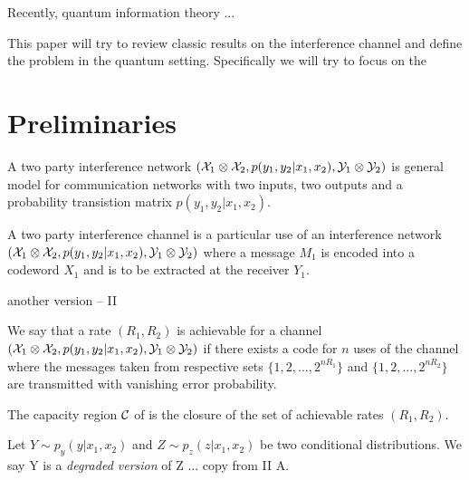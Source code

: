 \documentclass[aps,11pt,twoside,letterpaper]{article}
\begin{document}
    Recently, quantum information theory ...
    
    This paper will try to review classic results on the interference channel and
    define the problem in the quantum setting.
    Specifically we will try to focus on the 
    
    
    
    
 \section{Preliminaries}

        \begin{definition}
            A two party interference network $({\cal X}_1 \otimes {\cal X}_2, p(y_1,y_2|x_1,x_2), {\cal Y}_1 \otimes {\cal Y}_2)$ 
            is general model for communication networks with two inputs, two outputs and a probability transistion
            matrix $p(y_1,y_2|x_1,x_2)$.
        \end{definition}
        
        

        \begin{definition}
            A two party interference channel is a particular use of an interference network 
            $({\cal X}_1 \otimes {\cal X}_2, p(y_1,y_2|x_1,x_2), {\cal Y}_1 \otimes {\cal Y}_2)$ 
            where a message $M_1$ is encoded into a codeword $X_1$ and is to be extracted at the receiver $Y_1$.
        \end{definition}

        another version -- II

        
        \begin{definition}
            We say that a rate $(R_1,R_2)$ is achievable for a channel $({\cal X}_1 \otimes {\cal X}_2, p(y_1,y_2|x_1,x_2), {\cal Y}_1 \otimes {\cal Y}_2)$
            if there exists a code for $n$ uses of the channel where the messages taken from respective sets $\{1,2,\ldots,2^{nR_1} \}$ and
             $\{1,2,\ldots,2^{nR_2} \}$ are transmitted with vanishing error probability.
        \end{definition}
        
        
        \begin{definition}[Capacity]
            The capacity region ${\cal C}$ of is the closure of the set of achievable rates $(R_1,R_2)$.
        \end{definition}


        \begin{definition}
            Let $Y \sim p_y(y|x_1,x_2)$ and $Z \sim p_z(z|x_1,x_2)$ be two conditional distributions.
            We say Y is a \emph{degraded version} of Z ...
            copy from \cite{Carleial83} II A.
        \end{definition}
\end{document}

